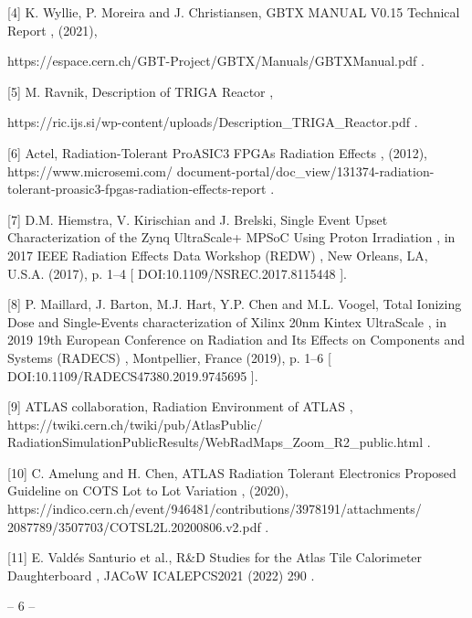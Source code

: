 \documentclass{article}
\begin{document}
[4]   K. Wyllie, P. Moreira and J. Christiansen,  GBTX MANUAL V0.15 Technical Report , (2021),

https://espace.cern.ch/GBT-Project/GBTX/Manuals/GBTXManual.pdf .

[5]   M. Ravnik,  Description of TRIGA Reactor ,

https://ric.ijs.si/wp-content/uploads/Description\_TRIGA\_Reactor.pdf .

[6]   Actel,  Radiation-Tolerant ProASIC3 FPGAs Radiation Effects , (2012),  https://www.microsemi.com/ 
document-portal/doc\_view/131374-radiation-tolerant-proasic3-fpgas-radiation-effects-report .

[7]   D.M. Hiemstra, V. Kirischian and J. Brelski,  Single Event Upset Characterization of the Zynq 
UltraScale+ MPSoC Using Proton Irradiation , in  2017 IEEE Radiation Effects Data Workshop 
(REDW) , New Orleans, LA, U.S.A. (2017), p. 1--4 [ DOI:10.1109/NSREC.2017.8115448 ].

[8]   P. Maillard, J. Barton, M.J. Hart, Y.P. Chen and M.L. Voogel,  Total Ionizing Dose and Single-Events 
characterization of Xilinx 20nm Kintex UltraScale , in  2019 19th European Conference on Radiation 
and Its Effects on Components and Systems (RADECS) , Montpellier, France (2019), p. 1--6 
[ DOI:10.1109/RADECS47380.2019.9745695 ].

[9]   ATLAS collaboration,  Radiation Environment of ATLAS ,  https://twiki.cern.ch/twiki/pub/AtlasPublic/ 
RadiationSimulationPublicResults/WebRadMaps\_Zoom\_R2\_public.html .

[10]   C. Amelung and H. Chen,  ATLAS Radiation Tolerant Electronics Proposed Guideline on COTS Lot to 
Lot Variation , (2020),  https://indico.cern.ch/event/946481/contributions/3978191/attachments/ 
2087789/3507703/COTSL2L.20200806.v2.pdf .

[11]   E. Vald\'es Santurio et al.,  R\&D Studies for the Atlas Tile Calorimeter Daughterboard ,  JACoW 
ICALEPCS2021  (2022) 290 .

-- 6 --
\end{document}
